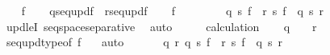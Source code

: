 \begin{isabellebody}
\ \ \isamarkupfalse%
\ f\isanewline
\ \ \isamarkupfalse%
\ {\isacharquery}{\kern0pt}q{\isacharequal}{\kern0pt}{\isachardoublequoteopen}seq{\isacharunderscore}{\kern0pt}upd{\isacharparenleft}{\kern0pt}f{\isacharcomma}{\kern0pt}{}{\isacharparenright}{\kern0pt}{\isachardoublequoteclose}\ \ {\isacharquery}{\kern0pt}r{\isacharequal}{\kern0pt}{\isachardoublequoteopen}seq{\isacharunderscore}{\kern0pt}upd{\isacharparenleft}{\kern0pt}f{\isacharcomma}{\kern0pt}{}{\isacharparenright}{\kern0pt}{\isachardoublequoteclose}\isanewline
\ \ \isamarkupfalse%
\ {\isachardoublequoteopen}f\ {\isasymin}\ {}{\isacharcircum}{\kern0pt}{\isacharless}{\kern0pt}{\isasymomega}{\isachardoublequoteclose}\isanewline
\ \ \isamarkupfalse%
\isanewline
\ \ \isamarkupfalse%
\ {\isachardoublequoteopen}{\isacharquery}{\kern0pt}q\ {\isasympreceq}s\ f\ {\isasymand}\ {\isacharquery}{\kern0pt}r\ {\isasympreceq}s\ f\ {\isasymand}\ {\isacharquery}{\kern0pt}q\ {\isasymbottom}s\ {\isacharquery}{\kern0pt}r{\isachardoublequoteclose}\ \isanewline
\ \ \ \ \isamarkupfalse%
\ upd{\isacharunderscore}{\kern0pt}leI\ seqspace{\isacharunderscore}{\kern0pt}separative\ \isamarkupfalse%
\ auto\isanewline
\ \ \isamarkupfalse%
\ \isamarkupfalse%
\ calculation\isanewline
\ \ \isamarkupfalse%
\ {\isachardoublequoteopen}{\isacharquery}{\kern0pt}q\ {\isasymin}\ {}{\isacharcircum}{\kern0pt}{\isacharless}{\kern0pt}{\isasymomega}{\isachardoublequoteclose}\ \ {\isachardoublequoteopen}{\isacharquery}{\kern0pt}r\ {\isasymin}\ {}{\isacharcircum}{\kern0pt}{\isacharless}{\kern0pt}{\isasymomega}{\isachardoublequoteclose}\isanewline
\ \ \ \ \isamarkupfalse%
\ seq{\isacharunderscore}{\kern0pt}upd{\isacharunderscore}{\kern0pt}type{\isacharbrackleft}{\kern0pt}of\ f\ {}{\isacharbrackright}{\kern0pt}\ \isamarkupfalse%
\ auto\isanewline
\ \ \isamarkupfalse%
\isanewline
\ \ \isamarkupfalse%
\ {\isachardoublequoteopen}{\isasymexists}q{\isasymin}{}{\isacharcircum}{\kern0pt}{\isacharless}{\kern0pt}{\isasymomega}{\isachardot}{\kern0pt}\ {\isasymexists}r{\isasymin}{}{\isacharcircum}{\kern0pt}{\isacharless}{\kern0pt}{\isasymomega}{\isachardot}{\kern0pt}\ q\ {\isasympreceq}s\ f\ {\isasymand}\ r\ {\isasympreceq}s\ f\ {\isasymand}\ q\ {\isasymbottom}s\ r{\isachardoublequoteclose}\isanewline
\ \ \ \ \isamarkupfalse%

\end{isabellebody}
